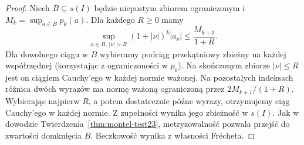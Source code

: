 \begin{proof}
Niech $B\subseteq s(I)$ będzie niepustym zbiorem
ograniczonym i $M_k=\sup_{a\in B}p_k(a)$.
Dla każdego $R\ge0$ mamy
\[
 \sup_{a\in B,\,|\nu|>R}(1+|\nu|)^k|a_\nu|
 \le \frac{M_{k+1}}{1+R}.
\]
Dla dowolnego ciągu w $B$ wybieramy podciąg
przekątniowy zbieżny na każdej współrzędnej
(korzystając z ograniczoności w $p_0$).
Na skończonym zbiorze $|\nu|\le R$ jest on
ciągiem Cauchy'ego w każdej normie ważonej.
Na pozostałych indeksach różnica dwóch wyrazów
ma normę ważoną ograniczoną przez $2M_{k+1}/(1+R)$.
Wybierając najpierw $R$, a potem dostatecznie późne
wyrazy, otrzymujemy ciąg Cauchy'ego w każdej normie.
Z zupełności wynika jego zbieżność w $s(I)$.
Jak w dowodzie Twierdzenia~\ref{thm:montel-test23},
metryzowalność pozwala przejść do zwartości domknięcia
$B$. Beczkowość wynika z własności Frécheta.
\end{proof}

